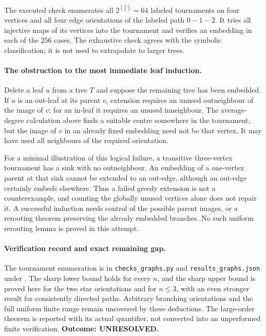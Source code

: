 \documentclass[11pt,a4paper]{article}
\begin{document}
The executed check enumerates all $2^{\binom42}=64$ labeled tournaments
on four vertices and all four edge orientations of the labeled path
$0-1-2$. It tries all injective maps of its vertices into the
tournament and verifies an embedding in each of the $256$ cases.
The exhaustive check agrees with the symbolic classification; it is
not used to extrapolate to larger trees.

\paragraph{The obstruction to the most immediate leaf induction.}
Delete a leaf $u$ from a tree $T$ and suppose the remaining tree has
been embedded. If $u$ is an out-leaf at its parent $v$, extension
requires an unused outneighbour of the image of $v$; for an in-leaf
it requires an unused inneighbour. The average-degree calculation
above finds a suitable centre somewhere in the tournament, but the
image of $v$ in an already fixed embedding need not be that vertex.
It may have used all neighbours of the required orientation.

For a minimal illustration of this logical failure, a transitive
three-vertex tournament has a sink with no outneighbour. An embedding
of a one-vertex parent at that sink cannot be extended to an out-edge,
although an out-edge certainly embeds elsewhere. Thus a failed greedy
extension is not a counterexample, and counting the globally unused
vertices alone does not repair it. A successful induction needs control
of the possible parent images, or a rerouting theorem preserving the
already embedded branches. No such uniform rerouting lemma is proved
in this attempt.

\paragraph{Verification record and exact remaining gap.}
The tournament enumeration is in \texttt{checks\_graphs.py} and
\texttt{results\_graphs.json} under
.
The sharp lower bound holds for every $n$, and the sharp upper bound
is proved here for the two star orientations and for $n\le3$, with
an even stronger result for consistently directed paths. Arbitrary
branching orientations and the full uniform finite range remain
uncovered by these deductions. The large-order theorem is reported
with its actual quantifier, not converted into an unperformed finite
verification. \textbf{Outcome: UNRESOLVED.}
\end{document}
